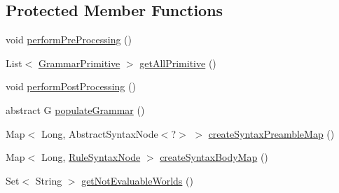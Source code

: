 \subsection*{Protected Member Functions}
\begin{DoxyCompactItemize}
\item 
void \hyperlink{classit_1_1emarolab_1_1cagg_1_1core_1_1evaluation_1_1semanticGrammar_1_1syntaxCompiler_1_1Gramma1bf252c3f4def91ad707660fdfe73d0a_addd9bea4d2d50c4976d3d7ac1a0f0b39}{perform\-Pre\-Processing} ()
\item 
List$<$ \hyperlink{classit_1_1emarolab_1_1cagg_1_1core_1_1language_1_1syntax_1_1GrammarPrimitive}{Grammar\-Primitive} $>$ \hyperlink{classit_1_1emarolab_1_1cagg_1_1core_1_1evaluation_1_1semanticGrammar_1_1syntaxCompiler_1_1Gramma1bf252c3f4def91ad707660fdfe73d0a_a641dc8da96a963740a175f0871f48d38}{get\-All\-Primitive} ()
\item 
void \hyperlink{classit_1_1emarolab_1_1cagg_1_1core_1_1evaluation_1_1semanticGrammar_1_1syntaxCompiler_1_1Gramma1bf252c3f4def91ad707660fdfe73d0a_af4fc64a98d3c6de86043175652f4fd60}{perform\-Post\-Processing} ()
\item 
abstract G \hyperlink{classit_1_1emarolab_1_1cagg_1_1core_1_1evaluation_1_1semanticGrammar_1_1syntaxCompiler_1_1Gramma1bf252c3f4def91ad707660fdfe73d0a_aba35a20c6b26fdf3638c68e989e387e3}{populate\-Grammar} ()
\item 
Map$<$ Long, Abstract\-Syntax\-Node$<$?$>$ $>$ \hyperlink{classit_1_1emarolab_1_1cagg_1_1core_1_1evaluation_1_1semanticGrammar_1_1syntaxCompiler_1_1Gramma1bf252c3f4def91ad707660fdfe73d0a_a1f41dca7d0b03da3daf1264693575dee}{create\-Syntax\-Preamble\-Map} ()
\item 
Map$<$ Long, \hyperlink{classit_1_1emarolab_1_1cagg_1_1core_1_1language_1_1syntax_1_1abstractTree_1_1syntaxNodeType_1_1RuleSyntaxNode}{Rule\-Syntax\-Node} $>$ \hyperlink{classit_1_1emarolab_1_1cagg_1_1core_1_1evaluation_1_1semanticGrammar_1_1syntaxCompiler_1_1Gramma1bf252c3f4def91ad707660fdfe73d0a_abdb0edbcf317c97f0702d1c3f8431a83}{create\-Syntax\-Body\-Map} ()
\item 
Set$<$ String $>$ \hyperlink{classit_1_1emarolab_1_1cagg_1_1core_1_1evaluation_1_1semanticGrammar_1_1syntaxCompiler_1_1Gramma1bf252c3f4def91ad707660fdfe73d0a_a669db898738e0f6315bf5af87855016c}{get\-Not\-Evaluable\-Worlds} ()
\end{DoxyCompactItemize}
